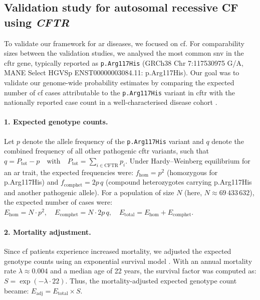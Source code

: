
\subsection{Validation study for autosomal recessive CF using \textit{CFTR}}

To validate our framework for \ac{ar} diseases, we focused on \ac{cf}.
For comparability sizes between the validation studies, we analysed the most common \ac{snv} in the \ac{cftr} gene, typically reported as \texttt{p.Arg117His} (GRCh38 Chr 7:117530975 G/A, MANE Select HGVSp ENST00000003084.11: p.Arg117His).
Our goal was to validate our genome-wide probability estimates by comparing the expected number of \ac{cf} cases attributable to the \texttt{p.Arg117His} variant in \ac{cftr} with the nationally reported case count in a well-characterised disease cohort
\cite{naito2023uk, castellani2013cftr2, Grasemann2023cftr}.

\paragraph{1. Expected genotype counts.}
Let \( p \) denote the allele frequency of the \texttt{p.Arg117His} variant and \( q \) denote the combined frequency of all other pathogenic \ac{cftr} variants, such that
$q = P_{\text{tot}} - p \quad \text{with} \quad P_{\text{tot}} = \sum_{i \in \text{CFTR}} p_i$.
Under Hardy–Weinberg equilibrium for an \ac{ar} trait, the expected frequencies were:
$f_{\text{hom}} = p^2$ (homozygous for p.Arg117His)
and
$f_{\text{comphet}} = 2p\,q$ 
(compound heterozygotes carrying p.Arg117His and another pathogenic allele).
For a population of size \( N \) (here, \( N \approx 69\,433\,632 \)), the expected number of cases were:
$E_{\text{hom}} = N \cdot p^2,\quad E_{\text{comphet}} = N \cdot 2p\,q,\quad E_{\text{total}} = E_{\text{hom}} + E_{\text{comphet}}$.

\paragraph{2. Mortality adjustment.}
Since \ac{cf} patients experience increased mortality, we adjusted the expected genotype counts using an exponential survival model \cite{naito2023uk, castellani2013cftr2, Grasemann2023cftr}. With an annual mortality rate \(\lambda \approx 0.004\) and a median age of 22 years, the survival factor was computed as:
$S = \exp(-\lambda \cdot 22)$.
Thus, the mortality-adjusted expected genotype count became:
$E_{\text{adj}} = E_{\text{total}} \times S$.

